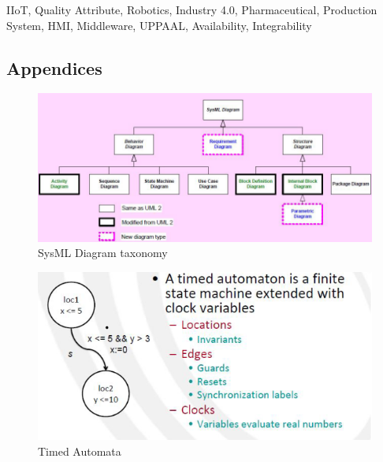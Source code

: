 \documentclass[conference]{IEEEtran}
\begin{document}
\maketitle
\IEEEpubidadjcol

\begin{IEEEkeywords}
IIoT, Quality Attribute, Robotics, Industry 4.0, Pharmaceutical, Production System, HMI, Middleware, UPPAAL, Availability, Integrability
\end{IEEEkeywords}















\begin{appendices}
\section{Appendices}

\begin{figure}[h]
    \centering
    \includegraphics[width=2\linewidth]{images/diagrams.png}
    \caption{SysML Diagram taxonomy \cite{Diagrams}}
    \label{SysMLDiagram}
\end{figure}

\pagebreak

\begin{figure}[h]
    \centering
    \includegraphics[width=1\linewidth]{images/timedautomata.png}
    \caption{Timed Automata \cite{Diagrams}}
    \label{fig:TimedAutomata}
\end{figure}

\end{appendices}
\vspace{12pt}
\end{document}

